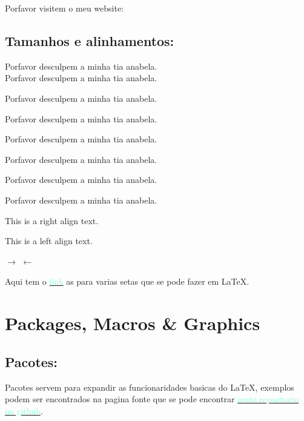 \documentclass[a4paper]{article}
\newcommand{\lk}[2]{\href{#1}{\textcolor{aquamarine}{#2}}}
\newcommand{\smol}{\small}
\begin{document}
Porfavor visitem o meu website: 
\subsection{Tamanhos e alinhamentos:}
\begin{center}

Porfavor desculpem a minha tia anabela.\\



\tiny
Porfavor desculpem a minha tia anabela.

\smol
Porfavor desculpem a minha tia anabela.

\normalsize
Porfavor desculpem a minha tia anabela.

\large
Porfavor desculpem a minha tia anabela.

\Large
Porfavor desculpem a minha tia anabela.

\huge
Porfavor desculpem a minha tia anabela.

\Huge
Porfavor desculpem a minha tia anabela.

\end{center}

\begin{flushright}

 This is a right align text.
\end{flushright}

\begin{flushleft}
 This is a left align text.
\end{flushleft}

$\rightarrow$
$\leftarrow$

Aqui tem o \lk{http://www.sascha-frank.com/Arrow/latex-arrows.html}{link} as para varias setas que se pode fazer em \LaTeX{}.

\section{Packages, Macros \& Graphics}
\subsection{Pacotes:}
    Pacotes servem para expandir as funcionaridades basicas do \LaTeX{}, exemplos podem ser encontrados na pagina fonte que se pode encontrar \href{https://github.com/OnikenX/LaTeX-showcase}{\textcolor{aquamarine}{neste repositorio no github}}.
    
\end{document}
